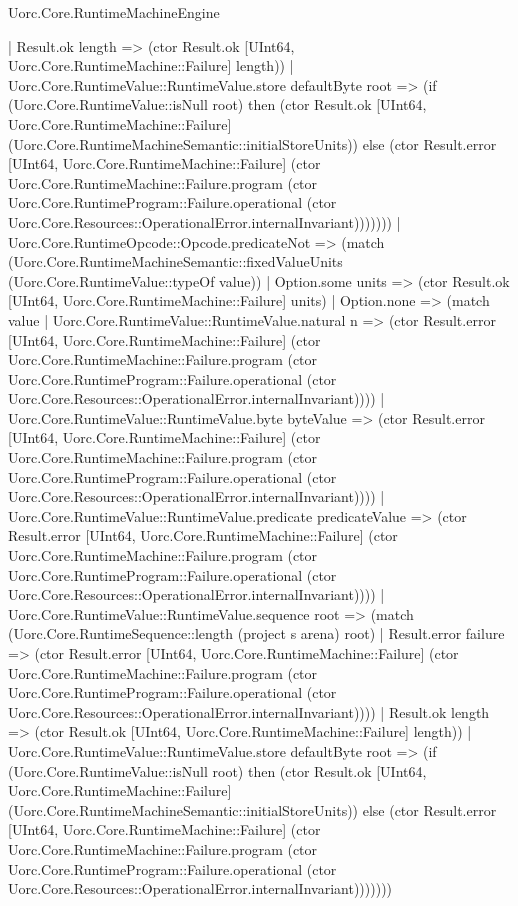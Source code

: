 \begin{lexlean}{Uorc.Core.RuntimeMachineEngine}
\begin{semanticmodule}
{                | Result.ok length => (ctor Result.ok [UInt64, Uorc.Core.RuntimeMachine::Failure] length))
              | Uorc.Core.RuntimeValue::RuntimeValue.store defaultByte root => (if (Uorc.Core.RuntimeValue::isNull root) then (ctor Result.ok [UInt64, Uorc.Core.RuntimeMachine::Failure] (Uorc.Core.RuntimeMachineSemantic::initialStoreUnits)) else (ctor Result.error [UInt64, Uorc.Core.RuntimeMachine::Failure] (ctor Uorc.Core.RuntimeMachine::Failure.program (ctor Uorc.Core.RuntimeProgram::Failure.operational (ctor Uorc.Core.Resources::OperationalError.internalInvariant)))))))
          | Uorc.Core.RuntimeOpcode::Opcode.predicateNot => (match (Uorc.Core.RuntimeMachineSemantic::fixedValueUnits (Uorc.Core.RuntimeValue::typeOf value))
            | Option.some units => (ctor Result.ok [UInt64, Uorc.Core.RuntimeMachine::Failure] units)
            | Option.none => (match value
              | Uorc.Core.RuntimeValue::RuntimeValue.natural n => (ctor Result.error [UInt64, Uorc.Core.RuntimeMachine::Failure] (ctor Uorc.Core.RuntimeMachine::Failure.program (ctor Uorc.Core.RuntimeProgram::Failure.operational (ctor Uorc.Core.Resources::OperationalError.internalInvariant))))
              | Uorc.Core.RuntimeValue::RuntimeValue.byte byteValue => (ctor Result.error [UInt64, Uorc.Core.RuntimeMachine::Failure] (ctor Uorc.Core.RuntimeMachine::Failure.program (ctor Uorc.Core.RuntimeProgram::Failure.operational (ctor Uorc.Core.Resources::OperationalError.internalInvariant))))
              | Uorc.Core.RuntimeValue::RuntimeValue.predicate predicateValue => (ctor Result.error [UInt64, Uorc.Core.RuntimeMachine::Failure] (ctor Uorc.Core.RuntimeMachine::Failure.program (ctor Uorc.Core.RuntimeProgram::Failure.operational (ctor Uorc.Core.Resources::OperationalError.internalInvariant))))
              | Uorc.Core.RuntimeValue::RuntimeValue.sequence root => (match (Uorc.Core.RuntimeSequence::length (project s arena) root)
                | Result.error failure => (ctor Result.error [UInt64, Uorc.Core.RuntimeMachine::Failure] (ctor Uorc.Core.RuntimeMachine::Failure.program (ctor Uorc.Core.RuntimeProgram::Failure.operational (ctor Uorc.Core.Resources::OperationalError.internalInvariant))))
                | Result.ok length => (ctor Result.ok [UInt64, Uorc.Core.RuntimeMachine::Failure] length))
              | Uorc.Core.RuntimeValue::RuntimeValue.store defaultByte root => (if (Uorc.Core.RuntimeValue::isNull root) then (ctor Result.ok [UInt64, Uorc.Core.RuntimeMachine::Failure] (Uorc.Core.RuntimeMachineSemantic::initialStoreUnits)) else (ctor Result.error [UInt64, Uorc.Core.RuntimeMachine::Failure] (ctor Uorc.Core.RuntimeMachine::Failure.program (ctor Uorc.Core.RuntimeProgram::Failure.operational (ctor Uorc.Core.Resources::OperationalError.internalInvariant)))))))
}
\end{semanticmodule}
\end{lexlean}
